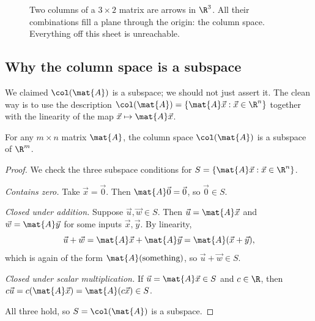 \begin{figure}[H]
\centering
{}
\caption{Two columns of a $3\times2$ matrix are arrows in $\R^3$. All their
combinations fill a plane through the origin: the column space. Everything off
this sheet is unreachable.}
\label{ch12:fig-colplane}
\end{figure}

\subsection{Why the column space is a subspace}

We claimed $\col(\mat{A})$ is a subspace; we should not just assert it. The clean
way is to use the description $\col(\mat{A}) = \{\mat{A}\vec{x} : \vec{x}\in\R^n\}$
together with the linearity of the map $\vec{x}\mapsto\mat{A}\vec{x}$.

\begin{proposition}\label{ch12:colspace-subspace}
For any $m\times n$ matrix $\mat{A}$, the column space $\col(\mat{A})$ is a
subspace of $\R^m$.
\end{proposition}

\begin{proof}
We check the three subspace conditions for $S = \{\mat{A}\vec{x}:\vec{x}\in\R^n\}$.

\emph{Contains zero.} Take $\vec{x}=\vec{0}$. Then $\mat{A}\vec{0}=\vec{0}$, so
$\vec{0}\in S$.

\emph{Closed under addition.} Suppose $\vec{u},\vec{w}\in S$. Then $\vec{u}
= \mat{A}\vec{x}$ and $\vec{w}=\mat{A}\vec{y}$ for some inputs $\vec{x},\vec{y}$.
By linearity,
\[
  \vec{u}+\vec{w} = \mat{A}\vec{x}+\mat{A}\vec{y} = \mat{A}(\vec{x}+\vec{y}),
\]
which is again of the form $\mat{A}(\text{something})$, so $\vec{u}+\vec{w}\in S$.

\emph{Closed under scalar multiplication.} If $\vec{u}=\mat{A}\vec{x}\in S$ and
$c\in\R$, then $c\vec{u} = c(\mat{A}\vec{x}) = \mat{A}(c\vec{x})\in S$.

All three hold, so $S=\col(\mat{A})$ is a subspace. \qedhere
\end{proof}

